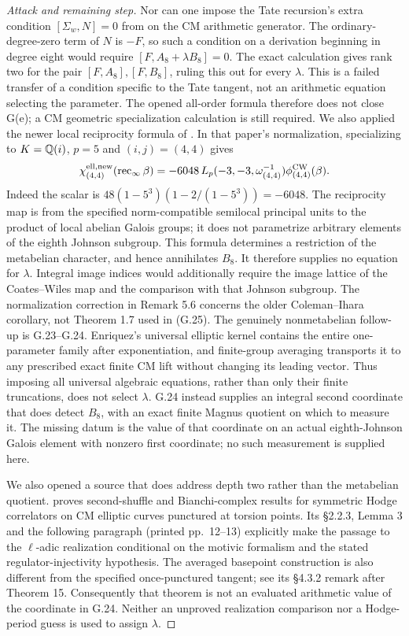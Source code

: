 \begin{proof}[Attack and remaining step]
Nor can one impose the Tate recursion's extra condition
$[\Sigma_w,N]=0$ from
\citet[Theorem 5.4.1(vii), equation (5.43)]{DorigoniEtAl2026}
on the CM arithmetic generator. The ordinary-degree-zero term
of $N$ is $-F$, so such a condition on a derivation beginning
in degree eight would require
$[F,A_8+\lambda B_8]=0$. The exact calculation gives rank two
for the pair $[F,A_8],[F,B_8]$, ruling this out for every
$\lambda$. This is a failed transfer of a condition specific
to the Tate tangent, not an arithmetic equation selecting
the parameter. The opened all-order formula therefore does
not close G(e); a CM geometric specialization calculation is
still required.
We also applied the newer local reciprocity formula of
\citet[Theorem 1.1, Corollary 5.5 and Remark 5.6]{GotoIshii2026Coleman}.
In that paper's normalization, specializing to $K=\mathbb Q(i)$, $p=5$
and $(i,j)=(4,4)$ gives
\[
 \chi^{\rm ell,new}_{(4,4)}(\operatorname{rec}_\infty\beta)
 =-6048\,L_p(-3,-3,\omega_{(4,4)}^{-1})
          \phi^{\rm CW}_{(4,4)}(\beta).
\]
Indeed the scalar is
$48(1-5^3)(1-2/(1-5^3))=-6048$.
The reciprocity map is from the specified norm-compatible semilocal
principal units to the product of local abelian Galois groups; it
does not parametrize arbitrary elements of the eighth Johnson subgroup.
This formula determines a restriction of the metabelian character,
and hence annihilates $B_8$. It therefore supplies no equation for
$\lambda$. Integral image indices would additionally require the
image lattice of the Coates--Wiles map and the comparison with that
Johnson subgroup. The normalization correction in Remark 5.6
concerns the older Coleman--Ihara corollary, not Theorem 1.7 used
in (G.25).
The genuinely nonmetabelian follow-up is G.23--G.24. Enriquez's
universal elliptic kernel contains the entire one-parameter
family after exponentiation, and finite-group averaging transports
it to any prescribed exact finite CM lift without changing its
leading vector. Thus imposing all universal algebraic equations,
rather than only their finite truncations, does not select
$\lambda$. G.24 instead supplies an integral second coordinate
that does detect $B_8$, with an exact finite Magnus quotient
on which to measure it. The missing datum is the value of that
coordinate on an actual eighth-Johnson Galois element with
nonzero first coordinate; no such measurement is supplied here.

We also opened a source that does address depth two rather than
the metabelian quotient. \citet[Theorems 11 and 16]{Malkin2020CM}
proves second-shuffle and Bianchi-complex results for symmetric
Hodge correlators on CM elliptic curves punctured at torsion
points. Its \S2.2.3, Lemma 3 and the following paragraph
(printed pp.~12--13) explicitly make the passage to the
$\ell$-adic realization conditional on the motivic formalism
and the stated regulator-injectivity hypothesis. The averaged
basepoint construction is also different from the specified
once-punctured tangent; see its \S4.3.2 remark after Theorem 15.
Consequently that theorem is not an evaluated arithmetic value
of the coordinate in G.24. Neither an unproved realization
comparison nor a Hodge-period guess is used to assign $\lambda$.


\end{proof}

